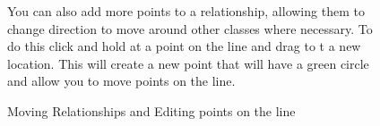\documentclass[a4paper]{article}
\begin{document}
{\begin{figure}[H]
\begin{center}
\end{center}
\vspace{-5pt}
You can also add more points to a relationship, allowing them to change direction to move around other classes where necessary. To do this click and hold at a point on the line and drag to t a new location. This will create a new point that will have a green circle and allow you to move points on the line.
\begin{center}
 \imagespace
{}
\vspace{-5pt}
\caption{Moving Relationships and Editing points on the line}
\end{center}
\end{figure}\vspace{-30pt}

}
\end{document}
